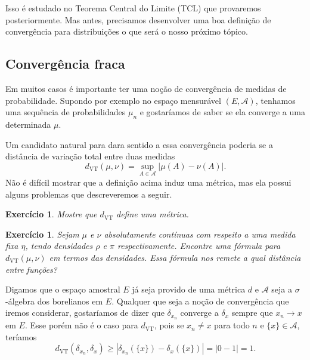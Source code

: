 \documentclass[reqno, final]{book}
\newcommand*\1{\mathds{1}}
\newtheorem{exercise}[example]{Exercício}
\DeclareMathOperator{\VT}{VT}
\begin{document}
Isso é estudado no Teorema Central do Limite (TCL) que provaremos posteriormente.
Mas antes, precisamos desenvolver uma boa definição de convergência para distribuições o que será o nosso próximo tópico.


\subsection{Convergência fraca}

Em muitos casos é importante ter uma noção de convergência de medidas de probabilidade.
Supondo por exemplo no espaço mensurável $(E,\mathcal{A})$, tenhamos uma sequência de probabilidades $\mu_n$ e gostaríamos de saber se ela converge a uma determinada $\mu$.

Um candidato natural para dara sentido a essa convergência poderia se a distância de variação total entre duas medidas
\begin{equation}
  d_{\VT}(\mu,\nu) = \sup_{A \in \mathcal{A}} |\mu(A) - \nu(A)|.
\end{equation}
Não é difícil mostrar que a definição acima induz uma métrica, mas ela possui alguns problemas que descreveremos a seguir.

\begin{exercise}
  Mostre que $d_{\VT}$ define uma métrica.
\end{exercise}

\begin{exercise}
  Sejam $\mu$ e $\nu$ absolutamente contínuas com respeito a uma medida fixa $\eta$, tendo densidades $\rho$ e $\pi$ respectivamente.
  Encontre uma fórmula para $d_{\VT}(\mu, \nu)$ em termos das densidades.
  Essa fórmula nos remete a qual distância entre funções?
\end{exercise}

Digamos que o espaço amostral $E$ já seja provido de uma métrica $d$ e $\mathcal{A}$ seja a $\sigma$-álgebra dos borelianos em $E$.
Qualquer que seja a noção de convergência que iremos considerar, gostaríamos de dizer que $\delta_{x_n}$ converge a $\delta_x$ sempre que $x_n \to x$ em $E$.
Esse porém não é o caso para $d_{\VT}$, pois se $x_n \neq x$ para todo $n$ e $\{x\} \in \mathcal{A}$, teríamos
\begin{equation}
  d_{\VT}(\delta_{x_n}, \delta_x) \geq |\delta_{x_n}(\{x\}) - \delta_{x}(\{x\}) | = |0 - 1| = 1.
\end{equation}
\end{document}
